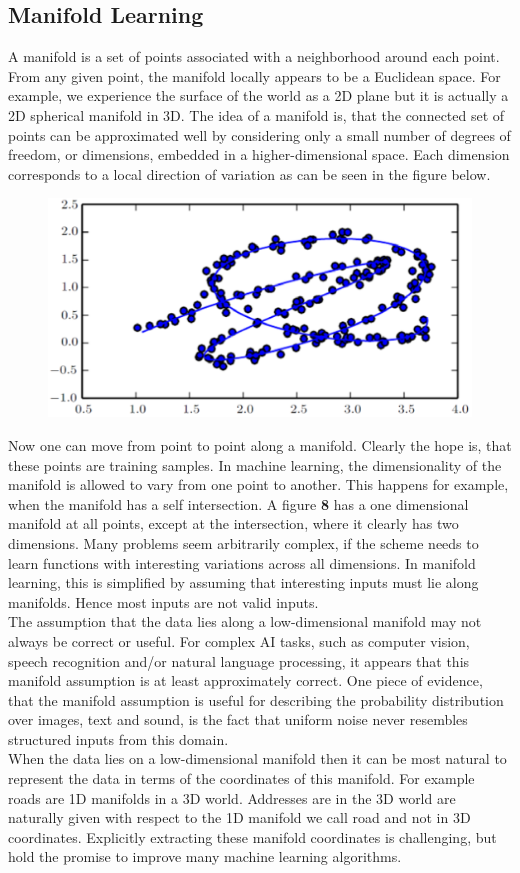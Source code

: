 \begin{multicols}{2}
	\subsection{Manifold Learning}
	A manifold is a set of points associated with a neighborhood around each point.
	From any given point, the manifold locally appears to be a Euclidean space.
	For example, we experience the surface of the world as a 2D plane but it is actually a 2D spherical manifold in 3D.
	The idea of a manifold is, that the connected set of points can be approximated well by considering only a small number of degrees of freedom, or dimensions, embedded in a higher-dimensional space. Each dimension corresponds to a local direction of variation as can be seen in the figure below.
	\begin{figure}[H]
		\centering
		\includegraphics[width=0.75\linewidth]{images/mani.PNG}
	\end{figure}
	Now one can move from point to point along a manifold. Clearly the hope is, that these points are training samples.
	In machine learning, the dimensionality of the manifold is allowed to vary from one point to another.
	This happens for example, when the manifold has a self intersection.
	A figure \textbf{8} has a one dimensional manifold at all points, except at the intersection, where it clearly has two dimensions.
	Many problems seem arbitrarily complex, if the scheme needs to learn functions with interesting variations across all dimensions.
	In manifold learning, this is simplified by assuming that interesting inputs must lie along manifolds. Hence most inputs are not valid inputs.\\
	
	The assumption that the data lies along a low-dimensional manifold may not always be correct or useful.
	For complex AI tasks, such as computer vision, speech recognition and/or natural language processing, it appears that this manifold assumption is at least approximately correct.
	One piece of evidence, that the manifold assumption is useful for describing the probability distribution over images, text and sound, is the fact that uniform noise never resembles structured inputs from this domain.\\
	
	When the data lies on a low-dimensional manifold then it can be most natural to represent the data in terms of the coordinates of this manifold.
	For example roads are 1D manifolds in a 3D world. Addresses are in the 3D world are naturally given with respect to the 1D manifold we call road and not in 3D coordinates. Explicitly extracting these manifold coordinates is challenging, but hold the promise to improve many machine learning algorithms.
\end{multicols}
